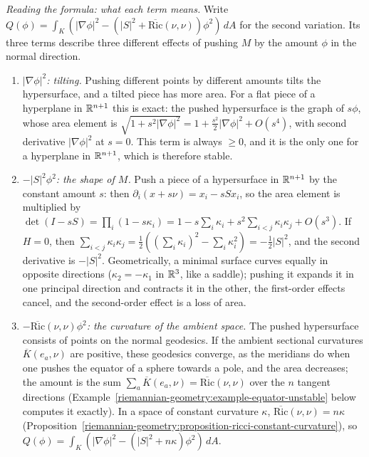 \begin{remark}\label{riemannian-geometry:remark-variation-area-riemannian}
\emph{Reading the formula: what each term means.} Write $Q(\phi) = \int_K(|\nabla\phi|^2 - (|S|^2 + \overline{\mathrm{Ric}}(\nu, \nu))\phi^2)\,dA$ for the second variation. Its three terms
describe three different effects of pushing $M$ by the amount $\phi$ in the normal direction.
\begin{enumerate}
\item \emph{$|\nabla\phi|^2$: tilting.} Pushing different points by different amounts tilts the hypersurface, and a tilted piece has more area. For a flat piece of a hyperplane in
$\mathbb{R}^{n+1}$ this is exact: the pushed hypersurface is the graph of $s\phi$, whose area element is $\sqrt{1 + s^2|\nabla\phi|^2} = 1 + \frac{s^2}2|\nabla\phi|^2 + O(s^4)$, with second
derivative $|\nabla\phi|^2$ at $s = 0$. This term is always $\geq 0$, and it is the only one for a hyperplane in $\mathbb{R}^{n+1}$, which is therefore stable.
\item \emph{$-|S|^2\phi^2$: the shape of $M$.} Push a piece of a hypersurface in $\mathbb{R}^{n+1}$ by the constant amount $s$: then $\partial_i(x + s\nu) = x_i - sSx_i$, so the area element is
multiplied by $\det(I - sS) = \prod_i(1 - s\kappa_i) = 1 - s\sum_i\kappa_i + s^2\sum_{i<j}\kappa_i\kappa_j + O(s^3)$. If $H = 0$, then
$\sum_{i<j}\kappa_i\kappa_j = \frac12((\sum_i\kappa_i)^2 - \sum_i\kappa_i^2) = -\frac12|S|^2$, and the second derivative is $-|S|^2$. Geometrically, a minimal surface curves equally in
opposite directions ($\kappa_2 = -\kappa_1$ in $\mathbb{R}^3$, like a saddle); pushing it expands it in one principal direction and contracts it in the other, the first-order effects cancel,
and the second-order effect is a loss of area.
\item \emph{$-\overline{\mathrm{Ric}}(\nu, \nu)\phi^2$: the curvature of the ambient space.} The pushed hypersurface consists of points on the normal geodesics. If the ambient sectional
curvatures $\overline{K}(e_a, \nu)$ are positive, these geodesics converge, as the meridians do when one pushes the equator of a sphere towards a pole, and the area decreases; the
amount is the sum $\sum_a\overline{K}(e_a, \nu) = \overline{\mathrm{Ric}}(\nu, \nu)$ over the $n$ tangent directions (Example~\ref{riemannian-geometry:example-equator-unstable} below
computes it exactly). In a space of constant curvature $\kappa$, $\overline{\mathrm{Ric}}(\nu, \nu) = n\kappa$ (Proposition~\ref{riemannian-geometry:proposition-ricci-constant-curvature}),
so $Q(\phi) = \int_K(|\nabla\phi|^2 - (|S|^2 + n\kappa)\phi^2)\,dA$.
\end{enumerate}


\end{remark}
